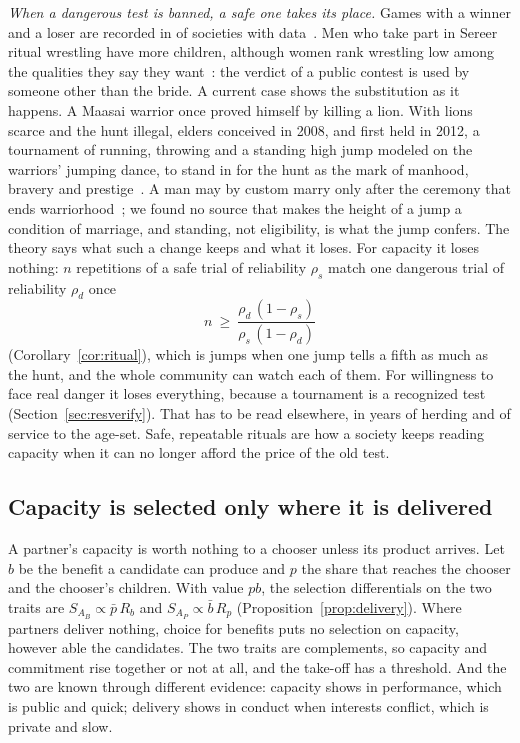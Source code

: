 \emph{When a dangerous test is banned, a safe one takes its place.} Games with a winner and a loser are recorded in
\CcGamesAny{} of \CcGamesN{} societies with data~\cite{roberts1959,kirby2016}. Men who take part in Sereer ritual
wrestling have more children, although women rank wrestling low among the qualities they say they
want~\cite{llaurens2009}: the verdict of a public contest is used by someone other than the bride. A current case shows
the substitution as it happens. A Maasai warrior once proved himself by killing a lion. With lions scarce and the hunt
illegal, elders conceived in 2008, and first held in 2012, a tournament of running, throwing and a standing high jump
modeled on the warriors' jumping dance, to stand in for the hunt as the mark of manhood, bravery and
prestige~\cite{maasaiolympics,aljazeera2022,hazzah2009,goldman2013}. A man may by custom marry only after the ceremony
that ends warriorhood~\cite{aljazeera2023,spencer1988}; we found no source that makes the height of a jump a condition of
marriage, and standing, not eligibility, is what the jump confers. The theory says what such a change keeps and what it
loses. For capacity it loses nothing: $n$ repetitions of a safe trial of reliability $\rho_s$ match one dangerous trial
of reliability $\rho_d$ once
\begin{equation}
n\ \ge\ \frac{\rho_d\,(1-\rho_s)}{\rho_s\,(1-\rho_d)}\label{eq:ritual}
\end{equation}
(Corollary~\ref{cor:ritual}), which is \NtRitA{} jumps when one jump tells a fifth as much as the hunt, and the whole
community can watch each of them. For willingness to face real danger it loses everything, because a tournament is a
recognized test (Section~\ref{sec:resverify}). That has to be read elsewhere, in years of herding and of service to the
age-set. Safe, repeatable rituals are how a society keeps reading capacity when it can no longer afford the price of the
old test.

\subsection{Capacity is selected only where it is delivered}\label{sec:resdelivery}

A partner's capacity is worth nothing to a chooser unless its product arrives. Let $b$ be the benefit a candidate can
produce and $p$ the share that reaches the chooser and the chooser's children. With value $pb$, the selection differentials
on the two traits are $S_{A_B}\propto\bar p\,R_b$ and $S_{A_P}\propto\bar b\,R_p$ (Proposition~\ref{prop:delivery}). Where
partners deliver nothing, choice for benefits puts no selection on capacity, however able the candidates. The two traits
are complements, so capacity and commitment rise together or not at all, and the take-off has a threshold. And the two
are known through different evidence: capacity shows in performance, which is public and quick; delivery shows in conduct
when interests conflict, which is private and slow.

